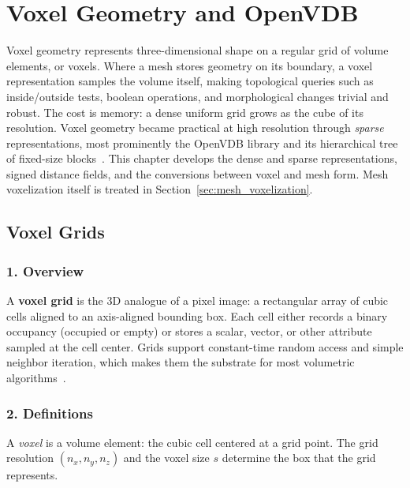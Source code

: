 \chapter{Voxel Geometry and OpenVDB}
\label{ch:voxel_geometry}

Voxel geometry represents three-dimensional shape on a
regular grid of volume elements, or voxels. Where a mesh stores geometry on
its boundary, a voxel representation samples the volume itself, making
topological queries such as inside/outside tests, boolean operations, and
morphological changes trivial and robust. The cost is memory: a dense uniform
grid grows as the cube of its resolution. Voxel geometry became practical at
high resolution through \emph{sparse} representations, most prominently the
OpenVDB library and its hierarchical tree of fixed-size blocks~\cite{museth2013}.
This chapter develops the dense and sparse representations, signed distance
fields, and the conversions between voxel and mesh form. Mesh
voxelization itself is treated in
Section~\ref{sec:mesh_voxelization}.

\section{Voxel Grids}
\label{sec:voxel_grids}

\subsection{1. Overview}
A \textbf{voxel grid} is the 3D analogue of a pixel image: a rectangular
array of cubic cells aligned to an axis-aligned bounding box. Each cell
either records a binary occupancy (occupied or empty) or stores a scalar,
vector, or other attribute sampled at the cell center. Grids support
constant-time random access and simple neighbor iteration, which makes them
the substrate for most volumetric algorithms~\cite{akeninemoller2001,nooruddin2003}.

\subsection{2. Definitions}

\begin{definition}[Voxel]\label{def:voxel_grid}
A \emph{voxel} is a volume element: the cubic cell centered at a grid point.
The grid resolution $(n_x, n_y, n_z)$ and the voxel size $s$ determine the
box that the grid represents.
\end{definition}

